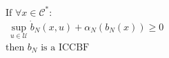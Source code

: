\documentclass[preview]{standalone}
\begin{document}
\begin{align*}
&\text{If }\forall x \in \mathcal{C}^*:\\ &\ \sup_{u \in \mathcal{U}} \dot b_N(x, u) + \alpha_N(b_N(x)) \geq 0\\ &\text{then } b_N \text{ is a ICCBF}
\end{align*}
\end{document}
